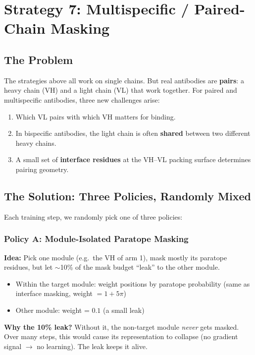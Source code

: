 \documentclass[11pt]{article}
\begin{document}
\section{Strategy 7: Multispecific / Paired-Chain Masking}
\label{sec:multispecific}

\subsection{The Problem}
The strategies above all work on single chains. But real antibodies
are \textbf{pairs}: a heavy chain (VH) and a light chain (VL)
that work together. For paired and multispecific antibodies, three
new challenges arise:
\begin{enumerate}
\item Which VL pairs with which VH matters for binding.
\item In bispecific antibodies, the light chain is often
      \textbf{shared} between two different heavy chains.
\item A small set of \textbf{interface residues} at the VH--VL
      packing surface determines pairing geometry.
\end{enumerate}

\subsection{The Solution: Three Policies, Randomly Mixed}
Each training step, we randomly pick one of three policies:

\subsubsection{Policy A: Module-Isolated Paratope Masking}

\textbf{Idea:} Pick one module (e.g.\ the VH of arm 1), mask
mostly its paratope residues, but let $\sim$10\% of the mask
budget ``leak'' to the other module.

\begin{itemize}
\item Within the target module: weight positions by paratope
      probability (same as interface masking, weight $= 1 + 5\pi$)
\item Other module: weight = $0.1$ (a small leak)
\end{itemize}

\textbf{Why the 10\% leak?}
Without it, the non-target module \emph{never} gets masked.
Over many steps, this would cause its representation to collapse
(no gradient signal $\to$ no learning). The leak keeps it alive.
\end{document}
